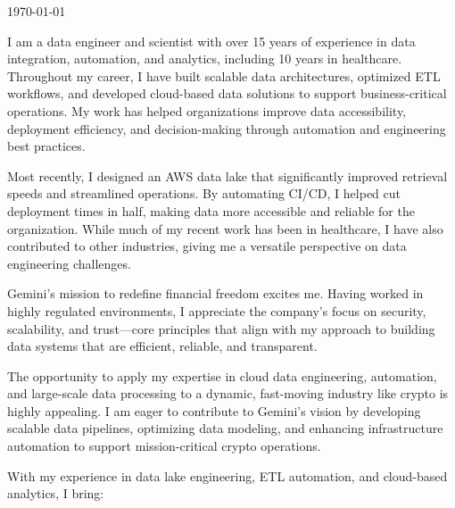 \documentclass[11pt, letterpaper]{awesome-cv}
\begin{document}
\makecvheader[R]

\makecvfooter
  {}
  {}
  {\today}


\begin{cvletter}

I am a data engineer and scientist with over 15 years of experience in data integration, automation, and analytics, including 10 years in healthcare. Throughout my career, I have built scalable data architectures, optimized ETL workflows, and developed cloud-based data solutions to support business-critical operations. My work has helped organizations improve data accessibility, deployment efficiency, and decision-making through automation and engineering best practices.

Most recently, I designed an AWS data lake that significantly improved retrieval speeds and streamlined operations. By automating CI/CD, I helped cut deployment times in half, making data more accessible and reliable for the organization. While much of my recent work has been in healthcare, I have also contributed to other industries, giving me a versatile perspective on data engineering challenges.

Gemini’s mission to redefine financial freedom excites me. Having worked in highly regulated environments, I appreciate the company’s focus on security, scalability, and trust—core principles that align with my approach to building data systems that are efficient, reliable, and transparent.

The opportunity to apply my expertise in cloud data engineering, automation, and large-scale data processing to a dynamic, fast-moving industry like crypto is highly appealing. I am eager to contribute to Gemini’s vision by developing scalable data pipelines, optimizing data modeling, and enhancing infrastructure automation to support mission-critical crypto operations.

With my experience in data lake engineering, ETL automation, and cloud-based analytics, I bring:


\end{cvletter}
\end{document}

